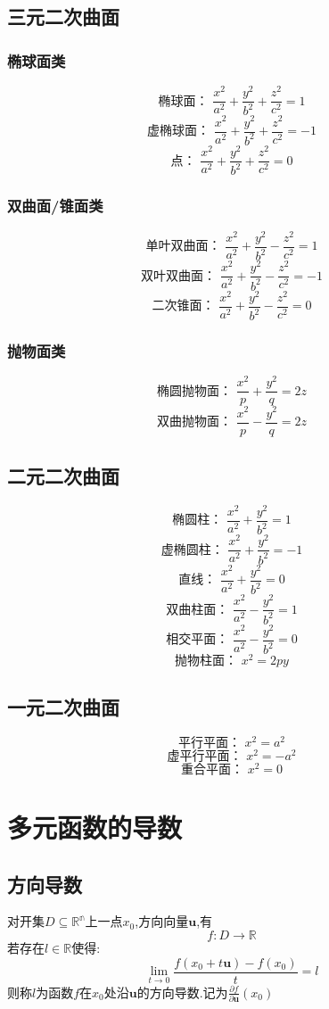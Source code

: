 \documentclass[12pt, a4paper, oneside]{ctexbook}
\begin{document}
  \subsection{三元二次曲面}
    \subsubsection{椭球面类}
    $$
    \text{椭球面： }\frac{x^2}{a^2}+\frac{y^2}{b^2}+\frac{z^2}{c^2}=1
    $$
    $$
    \text{虚椭球面： }\frac{x^2}{a^2}+\frac{y^2}{b^2}+\frac{z^2}{c^2}=-1
    $$
    $$
    \text{点： }\frac{x^2}{a^2}+\frac{y^2}{b^2}+\frac{z^2}{c^2}=0
    $$
    \subsubsection{双曲面/锥面类}
    $$
    \text{单叶双曲面： }\frac{x^2}{a^2}+\frac{y^2}{b^2}-\frac{z^2}{c^2}=1
    $$
    $$
    \text{双叶双曲面： }\frac{x^2}{a^2}+\frac{y^2}{b^2}-\frac{z^2}{c^2}=-1
    $$
    $$
    \text{二次锥面： }\frac{x^2}{a^2}+\frac{y^2}{b^2}-\frac{z^2}{c^2}=0
    $$
    \subsubsection{抛物面类}
    $$
    \text{椭圆抛物面： }\frac{x^2}{p}+\frac{y^2}{q}=2z
    $$
    $$
    \text{双曲抛物面： }\frac{x^2}{p}-\frac{y^2}{q}=2z
    $$
  \subsection{二元二次曲面}
    $$
    \text{椭圆柱： }\frac{x^2}{a^2}+\frac{y^2}{b^2}=1
    $$
    $$
    \text{虚椭圆柱： }\frac{x^2}{a^2}+\frac{y^2}{b^2}=-1
    $$
    $$
    \text{直线： }\frac{x^2}{a^2}+\frac{y^2}{b^2}=0
    $$
    $$
    \text{双曲柱面： }\frac{x^2}{a^2}-\frac{y^2}{b^2}=1
    $$
    $$
    \text{相交平面： }\frac{x^2}{a^2}-\frac{y^2}{b^2}=0
    $$
    $$
    \text{抛物柱面： }x^2=2py
    $$
  \subsection{一元二次曲面}
    $$
    \text{平行平面： }x^2=a^2
    $$
    $$
    \text{虚平行平面： }x^2=-a^2
    $$
    $$
    \text{重合平面： }x^2=0
    $$

\section{多元函数的导数}
  \subsection{方向导数}
  对开集$D\subseteq \mathbb{R^n}$上一点$x_0$,方向向量$\textbf{u}$,有
  $$
  f:D\rightarrow \mathbb{R}
  $$
  若存在$l\in\mathbb{R}$使得:
  $$
  \lim_{t \to 0} \frac{f(x_0+t\textbf{u})-f(x_0)}{t} =l
  $$
  则称$l$为函数$f$在$x_0$处沿$\textbf{u}$的方向导数.记为$\frac{\partial f}{\partial \textbf{u}}(x_0)$
\end{document}
